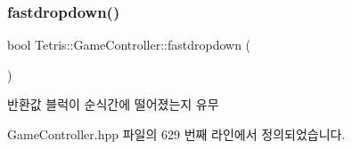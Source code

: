 \subsubsection{\texorpdfstring{fastdropdown()}{fastdropdown()}\hspace{0.1cm}{\footnotesize\ttfamily [2/2]}}
{\footnotesize\ttfamily bool Tetris\+::\+Game\+Controller\+::fastdropdown (\begin{DoxyParamCaption}{ }\end{DoxyParamCaption})\hspace{0.3cm}{\ttfamily [inline]}}

\begin{DoxyReturn}{반환값}
블럭이 순식간에 떨어졌는지 유무 
\end{DoxyReturn}


Game\+Controller.\+hpp 파일의 629 번째 라인에서 정의되었습니다.


